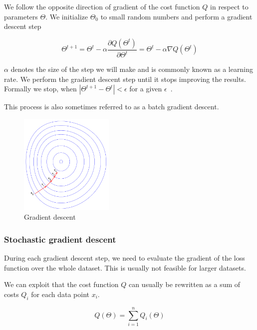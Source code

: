     We follow the opposite direction of gradient of the cost function $Q$ in respect to parameters $\Theta$. 
    We initialize $\Theta_0$ to small random numbers and perform a gradient descent step
    
    \begin{equation}
      \Theta^{t+1} = \Theta^t - \alpha \frac{\partial Q(\Theta^t)}{\partial \Theta^t} = \Theta^t - \alpha \nabla Q(\Theta^t)
      \label{eq:gradient:descent}
    \end{equation}

    $\alpha$ denotes the size of the step we will make and is commonly known as a learning rate. 
    We perform the gradient descent step until it stops improving the results.
    Formally we stop, when $|\Theta^{t+1} - \Theta^t| < \epsilon$ for a given $\epsilon$~\cite{bottou-bousquet-2008}.
    
    This process is also sometimes referred to as a batch gradient descent.

    \begin{figure}
    \centerline{\includegraphics[width=0.4\textwidth]{images/gradient_descent}}
    \caption[Gradient descent]{Gradient descent~\cite{pict}}
    \label{obr:gradient}
    \end{figure}
    
    \subsubsection{Stochastic gradient descent}
    
    During each gradient descent step, we need to evaluate the gradient of the loss function over the whole dataset.
    This is usually not feasible for larger datasets. 
    
    We can exploit that the cost function $Q$ can usually be rewritten as a sum of costs $Q_i$ for each data point $x_i$.
    
    $$Q(\Theta) = \sum_{i=1}^n Q_i(\Theta)$$
    
